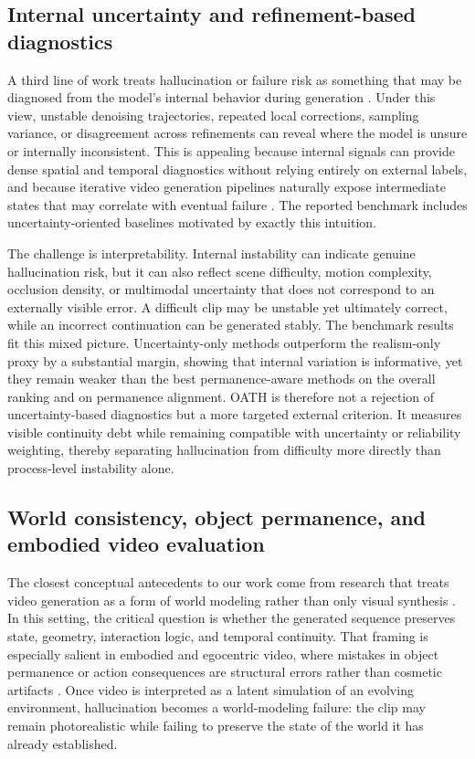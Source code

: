 \documentclass{article}
\begin{document}
\subsection{Internal uncertainty and refinement-based diagnostics}

A third line of work treats hallucination or failure risk as something that may be diagnosed from the model's internal behavior during generation \cite{consistency_models2023,diffusion_uncertainty2024,self_consistency2023,videogpt2021,videodiffusion2022}. Under this view, unstable denoising trajectories, repeated local corrections, sampling variance, or disagreement across refinements can reveal where the model is unsure or internally inconsistent. This is appealing because internal signals can provide dense spatial and temporal diagnostics without relying entirely on external labels, and because iterative video generation pipelines naturally expose intermediate states that may correlate with eventual failure \cite{videocrafter2024,dynamicrafter2024,latentvideo2023}. The reported benchmark includes uncertainty-oriented baselines motivated by exactly this intuition.

The challenge is interpretability. Internal instability can indicate genuine hallucination risk, but it can also reflect scene difficulty, motion complexity, occlusion density, or multimodal uncertainty that does not correspond to an externally visible error. A difficult clip may be unstable yet ultimately correct, while an incorrect continuation can be generated stably. The benchmark results fit this mixed picture. Uncertainty-only methods outperform the realism-only proxy by a substantial margin, showing that internal variation is informative, yet they remain weaker than the best permanence-aware methods on the overall ranking and on permanence alignment. OATH is therefore not a rejection of uncertainty-based diagnostics but a more targeted external criterion. It measures visible continuity debt while remaining compatible with uncertainty or reliability weighting, thereby separating hallucination from difficulty more directly than process-level instability alone.

\subsection{World consistency, object permanence, and embodied video evaluation}

The closest conceptual antecedents to our work come from research that treats video generation as a form of world modeling rather than only visual synthesis \cite{dreamdojo2026,genie2024,worldsim2024,egoworld2024,rt2video2024}. In this setting, the critical question is whether the generated sequence preserves state, geometry, interaction logic, and temporal continuity. That framing is especially salient in embodied and egocentric video, where mistakes in object permanence or action consequences are structural errors rather than cosmetic artifacts \cite{dreamdojo2026,egoworld2024}. Once video is interpreted as a latent simulation of an evolving environment, hallucination becomes a world-modeling failure: the clip may remain photorealistic while failing to preserve the state of the world it has already established.
\end{document}
